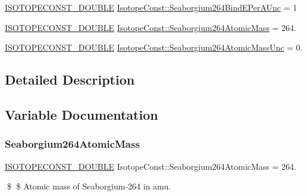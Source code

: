 \begin{DoxyCompactItemize}
\mbox{\hyperlink{group___isotope_const-_macros_ga8f45a7272ce02c0b4c65c44636ed719a}{I\+S\+O\+T\+O\+P\+E\+C\+O\+N\+S\+T\+\_\+\+D\+O\+U\+B\+LE}} \mbox{\hyperlink{group___isotope_const-_seaborgium-_sg264_ga533f328a3f3ba5da195679e43825bc49}{Isotope\+Const\+::\+Seaborgium264\+Bind\+E\+Per\+A\+Unc}} = 1
\item 
\mbox{\hyperlink{group___isotope_const-_macros_ga8f45a7272ce02c0b4c65c44636ed719a}{I\+S\+O\+T\+O\+P\+E\+C\+O\+N\+S\+T\+\_\+\+D\+O\+U\+B\+LE}} \mbox{\hyperlink{group___isotope_const-_seaborgium-_sg264_gacca253df0dfa6937b6419e1d61991a16}{Isotope\+Const\+::\+Seaborgium264\+Atomic\+Mass}} = 264.
\item 
\mbox{\hyperlink{group___isotope_const-_macros_ga8f45a7272ce02c0b4c65c44636ed719a}{I\+S\+O\+T\+O\+P\+E\+C\+O\+N\+S\+T\+\_\+\+D\+O\+U\+B\+LE}} \mbox{\hyperlink{group___isotope_const-_seaborgium-_sg264_gadec456269ab2a01d9e38455df102e016}{Isotope\+Const\+::\+Seaborgium264\+Atomic\+Mass\+Unc}} = 0.
\end{DoxyCompactItemize}


\subsection{Detailed Description}


\subsection{Variable Documentation}
\mbox{\label{group___isotope_const-_seaborgium-_sg264_gacca253df0dfa6937b6419e1d61991a16}} 
\subsubsection{\texorpdfstring{Seaborgium264\+Atomic\+Mass}{Seaborgium264AtomicMass}}
{\footnotesize\ttfamily \mbox{\hyperlink{group___isotope_const-_macros_ga8f45a7272ce02c0b4c65c44636ed719a}{I\+S\+O\+T\+O\+P\+E\+C\+O\+N\+S\+T\+\_\+\+D\+O\+U\+B\+LE}} Isotope\+Const\+::\+Seaborgium264\+Atomic\+Mass = 264.}

\$ \$ Atomic mass of Seaborgium-\/264 in amu. \mbox{\label{group___isotope_const-_seaborgium-_sg264_gadec456269ab2a01d9e38455df102e016}} 
